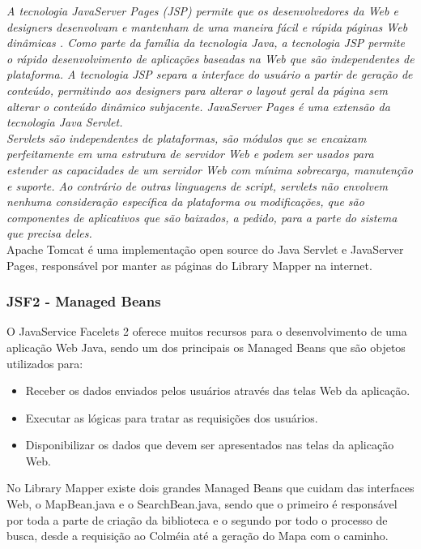 \documentclass[a4paper,10pt]{article}
\begin{document}
	{\it A tecnologia JavaServer Pages (JSP) permite que os desenvolvedores da Web e
	 designers desenvolvam e mantenham de uma maneira fácil e rápida páginas Web dinâmicas 
	. Como parte da família da tecnologia Java, a tecnologia JSP permite o rápido desenvolvimento
	 de aplicações baseadas na Web que são independentes de plataforma. A tecnologia JSP separa
	 a interface do usuário a partir de geração de conteúdo, permitindo aos designers para alterar
	 o layout geral da página sem alterar o conteúdo dinâmico subjacente. JavaServer Pages é uma extensão 
	da tecnologia Java Servlet.\\
	
	 Servlets são independentes de plataformas, são módulos que se encaixam perfeitamente em 
	uma estrutura de servidor Web e podem ser usados para estender
	 as capacidades de um servidor Web com mínima sobrecarga, manutenção e suporte. Ao contrário de outras linguagens de
	 script, servlets não envolvem nenhuma consideração específica da plataforma ou modificações, que são componentes de
	 aplicativos que são baixados, a pedido, para a parte do sistema que precisa deles.}\cite{jsp}\\

	Apache Tomcat é uma implementação open source do Java Servlet e JavaServer Pages, responsável por manter as páginas do Library Mapper
	na internet.
	
	\subsubsection{JSF2 - Managed Beans}
	O JavaService Facelets 2 oferece muitos recursos para o desenvolvimento de uma aplicação Web Java, sendo um dos principais os Managed Beans que são
	objetos utilizados para:
		{\it\begin{itemize}
	\item{Receber os dados enviados pelos usuários através das telas Web da aplicação.}
	\item{Executar as lógicas para tratar as requisições dos usuários.}
	\item{Disponibilizar os dados que devem ser apresentados nas telas da aplicação Web.}\cite{k19}	 	
	\end{itemize}}
	
	No Library Mapper existe dois grandes Managed Beans que cuidam das interfaces Web, o MapBean.java e o SearchBean.java, sendo que o 
	primeiro é responsável por toda a parte de criação da biblioteca e o segundo por todo o processo de busca, desde a requisição ao 
	Colméia até a geração do Mapa com o caminho.
	
\end{document}
